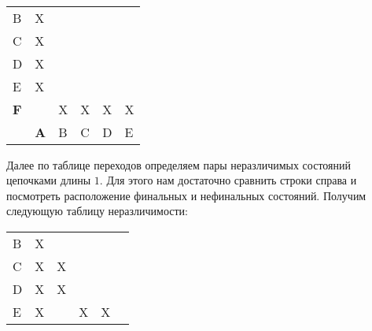 \begin{myexample}
\\
 \begin{center}
\begin{tabular}{llllll}
\cline{2-2}
\multicolumn{1}{l|}{B}          & \multicolumn{1}{l|}{X} &                        &                        &                        &                        \\ \cline{2-3}
\multicolumn{1}{l|}{C}          & \multicolumn{1}{l|}{X} & \multicolumn{1}{l|}{}  &                        &                        &                        \\ \cline{2-4}
\multicolumn{1}{l|}{D}          & \multicolumn{1}{l|}{X} & \multicolumn{1}{l|}{}  & \multicolumn{1}{l|}{}  &                        &                        \\ \cline{2-5}
\multicolumn{1}{l|}{E}          & \multicolumn{1}{l|}{X} & \multicolumn{1}{l|}{}  & \multicolumn{1}{l|}{}  & \multicolumn{1}{l|}{}  &                        \\ \cline{2-6}
\multicolumn{1}{l|}{\textbf{F}} & \multicolumn{1}{l|}{}  & \multicolumn{1}{l|}{X} & \multicolumn{1}{l|}{X} & \multicolumn{1}{l|}{X} & \multicolumn{1}{l|}{X} \\ \cline{2-6}
                                & \textbf{A}             & B                      & C                      & D                      & E
\end{tabular}
\end{center}
Далее по таблице переходов определяем пары неразличимых состояний цепочками длины $1$. Для этого нам достаточно сравнить строки справа и посмотреть расположение финальных и нефинальных состояний. Получим следующую таблицу неразличимости:
\\
\begin{center}
\begin{tabular}{llllll}
\cline{2-2}
\multicolumn{1}{l|}{B}          & \multicolumn{1}{l|}{X} &                        &                        &                        &                        \\ \cline{2-3}
\multicolumn{1}{l|}{C}          & \multicolumn{1}{l|}{X} & \multicolumn{1}{l|}{X} &                        &                        &                        \\ \cline{2-4}
\multicolumn{1}{l|}{D}          & \multicolumn{1}{l|}{X} & \multicolumn{1}{l|}{X} & \multicolumn{1}{l|}{}  &                        &                        \\ \cline{2-5}
\multicolumn{1}{l|}{E}          & \multicolumn{1}{l|}{X} & \multicolumn{1}{l|}{}  & \multicolumn{1}{l|}{X} & \multicolumn{1}{l|}{X} &                        \\ \cline{2-6}

\end{tabular}
\end{center}
\end{myexample}
